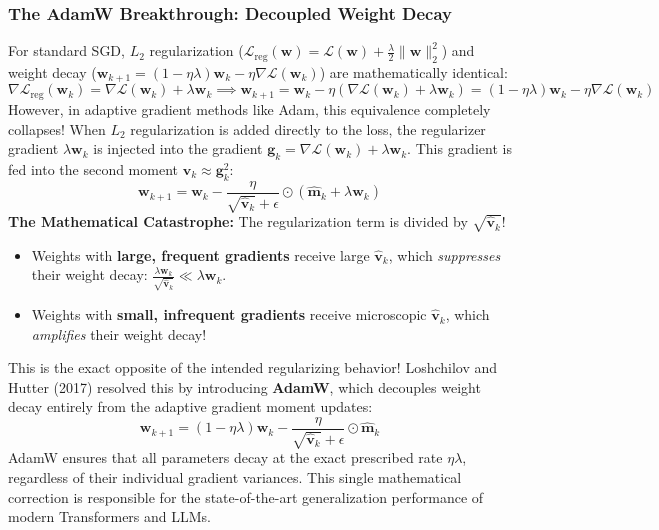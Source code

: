 \subsubsection{The AdamW Breakthrough: Decoupled Weight Decay}
For standard SGD, $L_2$ regularization ($\mathcal{L}_{\text{reg}}(\mathbf{w}) = \mathcal{L}(\mathbf{w}) + \frac{\lambda}{2}\|\mathbf{w}\|_2^2$) and weight decay ($\mathbf{w}_{k+1} = (1 - \eta \lambda)\mathbf{w}_k - \eta \nabla \mathcal{L}(\mathbf{w}_k)$) are mathematically identical:
\begin{equation}
\nabla \mathcal{L}_{\text{reg}}(\mathbf{w}_k) = \nabla \mathcal{L}(\mathbf{w}_k) + \lambda \mathbf{w}_k \implies \mathbf{w}_{k+1} = \mathbf{w}_k - \eta (\nabla \mathcal{L}(\mathbf{w}_k) + \lambda \mathbf{w}_k) = (1 - \eta \lambda)\mathbf{w}_k - \eta \nabla \mathcal{L}(\mathbf{w}_k)
\end{equation}
However, in adaptive gradient methods like Adam, this equivalence completely collapses!
When $L_2$ regularization is added directly to the loss, the regularizer gradient $\lambda \mathbf{w}_k$ is injected into the gradient $\mathbf{g}_k = \nabla \mathcal{L}(\mathbf{w}_k) + \lambda \mathbf{w}_k$. This gradient is fed into the second moment $\mathbf{v}_k \approx \mathbf{g}_k^2$:
\begin{equation}
\mathbf{w}_{k+1} = \mathbf{w}_k - \frac{\eta}{\sqrt{\hat{\mathbf{v}}_k} + \epsilon} \odot \left( \hat{\mathbf{m}}_k + \lambda \mathbf{w}_k \right)
\end{equation}
\textbf{The Mathematical Catastrophe:} The regularization term is divided by $\sqrt{\hat{\mathbf{v}}_k}$!
\begin{itemize}
    \item Weights with \textbf{large, frequent gradients} receive large $\hat{\mathbf{v}}_k$, which \emph{suppresses} their weight decay: $\frac{\lambda \mathbf{w}_k}{\sqrt{\hat{\mathbf{v}}_k}} \ll \lambda \mathbf{w}_k$.
    \item Weights with \textbf{small, infrequent gradients} receive microscopic $\hat{\mathbf{v}}_k$, which \emph{amplifies} their weight decay!
\end{itemize}
This is the exact opposite of the intended regularizing behavior!
Loshchilov and Hutter (2017) resolved this by introducing \textbf{AdamW}, which decouples weight decay entirely from the adaptive gradient moment updates:
\begin{equation}
\mathbf{w}_{k+1} = (1 - \eta \lambda)\mathbf{w}_k - \frac{\eta}{\sqrt{\hat{\mathbf{v}}_k} + \epsilon} \odot \hat{\mathbf{m}}_k
\label{eq:adamw_update}
\end{equation}
AdamW ensures that all parameters decay at the exact prescribed rate $\eta \lambda$, regardless of their individual gradient variances. This single mathematical correction is responsible for the state-of-the-art generalization performance of modern Transformers and LLMs.

